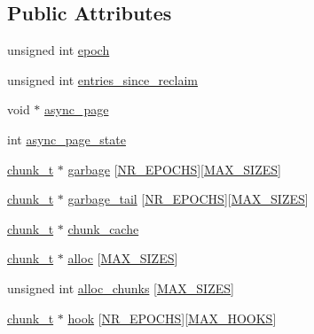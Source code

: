 \subsection*{Public Attributes}
\begin{DoxyCompactItemize}
\item 
unsigned int \hyperlink{structgc__st_aa9ad4f123ba3c959123e85406bfe149b}{epoch}
\item 
unsigned int \hyperlink{structgc__st_abdb3ffc1ba4e5d4250ad4ec03d8eff50}{entries\-\_\-since\-\_\-reclaim}
\item 
void $\ast$ \hyperlink{structgc__st_af00135e23e51902c07df6f359491bc80}{async\-\_\-page}
\item 
int \hyperlink{structgc__st_a916bd3e0e79b8461de68a4ca9084af0e}{async\-\_\-page\-\_\-state}
\item 
\hyperlink{gc_8c_a86d0de2b8550a1f7156c949ace00bba1}{chunk\-\_\-t} $\ast$ \hyperlink{structgc__st_a9a4e8e2d1ad05d2683be3e43b01439e5}{garbage} \mbox{[}\hyperlink{gc_8c_ab6c2f14e285c375d1c06ea4ce7c52c22}{N\-R\-\_\-\-E\-P\-O\-C\-H\-S}\mbox{]}\mbox{[}\hyperlink{gc_8c_ab0e65719548729791281faee6068905b}{M\-A\-X\-\_\-\-S\-I\-Z\-E\-S}\mbox{]}
\item 
\hyperlink{gc_8c_a86d0de2b8550a1f7156c949ace00bba1}{chunk\-\_\-t} $\ast$ \hyperlink{structgc__st_ac442c1204915548c2f15be6de336a7f1}{garbage\-\_\-tail} \mbox{[}\hyperlink{gc_8c_ab6c2f14e285c375d1c06ea4ce7c52c22}{N\-R\-\_\-\-E\-P\-O\-C\-H\-S}\mbox{]}\mbox{[}\hyperlink{gc_8c_ab0e65719548729791281faee6068905b}{M\-A\-X\-\_\-\-S\-I\-Z\-E\-S}\mbox{]}
\item 
\hyperlink{gc_8c_a86d0de2b8550a1f7156c949ace00bba1}{chunk\-\_\-t} $\ast$ \hyperlink{structgc__st_a047ca4f5451bbc921224a07a9521a780}{chunk\-\_\-cache}
\item 
\hyperlink{gc_8c_a86d0de2b8550a1f7156c949ace00bba1}{chunk\-\_\-t} $\ast$ \hyperlink{structgc__st_ad2473d591b0ffda8ce54ca445f6f6662}{alloc} \mbox{[}\hyperlink{gc_8c_ab0e65719548729791281faee6068905b}{M\-A\-X\-\_\-\-S\-I\-Z\-E\-S}\mbox{]}
\item 
unsigned int \hyperlink{structgc__st_a1adda3a9c4a27de6dbc5245c62d083d1}{alloc\-\_\-chunks} \mbox{[}\hyperlink{gc_8c_ab0e65719548729791281faee6068905b}{M\-A\-X\-\_\-\-S\-I\-Z\-E\-S}\mbox{]}
\item 
\hyperlink{gc_8c_a86d0de2b8550a1f7156c949ace00bba1}{chunk\-\_\-t} $\ast$ \hyperlink{structgc__st_a7bbafe17b373d9a64f0cc1aaf4e2b9f2}{hook} \mbox{[}\hyperlink{gc_8c_ab6c2f14e285c375d1c06ea4ce7c52c22}{N\-R\-\_\-\-E\-P\-O\-C\-H\-S}\mbox{]}\mbox{[}\hyperlink{gc_8c_a95b6a1ec44c296be366d09c891676556}{M\-A\-X\-\_\-\-H\-O\-O\-K\-S}\mbox{]}
\end{DoxyCompactItemize}


